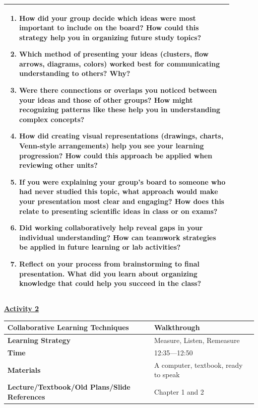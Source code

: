 \documentclass{article}
\begin{document}
\begin{flushleft}
\begin{tabular}{|p{0.9\linewidth}|}
\begin{enumerate}
    \item How did your group decide which ideas were most important to include on the board? How could this strategy help you in organizing future study topics?
    \item Which method of presenting your ideas (clusters, flow arrows, diagrams, colors) worked best for communicating understanding to others? Why?
    \item Were there connections or overlaps you noticed between your ideas and those of other groups? How might recognizing patterns like these help you in understanding complex concepts?
    \item How did creating visual representations (drawings, charts, Venn-style arrangements) help you see your learning progression? How could this approach be applied when reviewing other units?
    \item If you were explaining your group's board to someone who had never studied this topic, what approach would make your presentation most clear and engaging? How does this relate to presenting scientific ideas in class or on exams?
    \item Did working collaboratively help reveal gaps in your individual understanding? How can teamwork strategies be applied in future learning or lab activities?
    \item Reflect on your process from brainstorming to final presentation. What did you learn about organizing knowledge that could help you succeed in the class?
\end{enumerate} \\

\hline
\end{tabular}
\newpage

\noindent
\textbf{\underline{Activity 2}} \\
\begin{tabular}{|p{4.2cm}|p{9.8cm}|}
\hline
\textbf{Collaborative Learning Techniques} & Walkthrough \\
\hline
\textbf{Learning Strategy} & Measure, Listen, Remeasure \\
\hline
\textbf{Time} & 12:35---12:50 \\
\hline
\textbf{Materials} & A computer, textbook, ready to speak \\
\hline
\textbf{Lecture/Textbook/Old Plans/Slide References} &  Chapter 1 and 2 \\
\hline
\end{tabular}


\end{flushleft}
\end{document}
